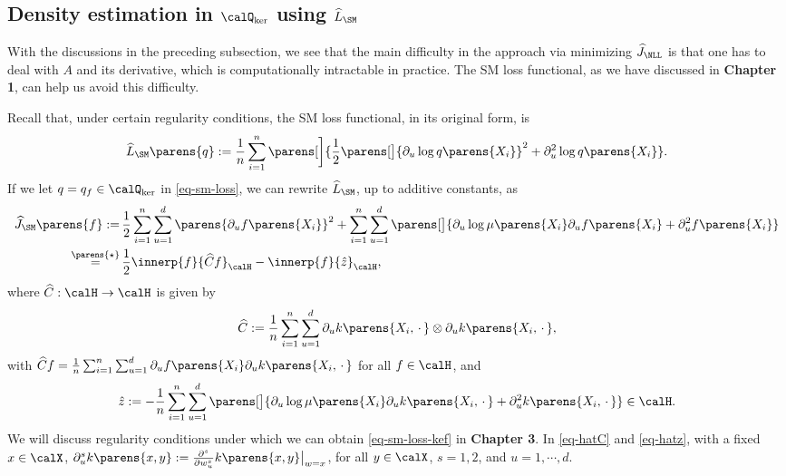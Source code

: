 \documentclass[12pt]{article}
\theoremstyle{definition}
\theoremstyle{theorem}
\theoremstyle{remark}
\begin{document}
\subsection{Density estimation in $\calQ_{\ker}$ using $\widehat{L}_{\SM}$}\label{subsection-sm-kef}


With the discussions in the preceding subsection, we see that the main difficulty in the approach via minimizing $\widehat{J}_{\NLL}$ is that one has to deal with $A$ and its derivative, which is computationally intractable in practice. The SM loss functional, as we have discussed in \textbf{\color{red} Chapter 1}, can help us avoid this difficulty. 

Recall that, under certain regularity conditions, the SM loss functional, in its original form, is 
\begin{align}\label{eq-sm-loss}
	\widehat{L}_{\SM} \parens{q} := \frac{1}{n} \sum_{i=1}^n \parens[\bigg]{\frac{1}{2} \parens[\big]{\partial_u \log q \parens{X_i}}^2 + \partial_u^2 \log q \parens{X_i}}. 
\end{align}
If we let $q = q_f \in \calQ_{\ker}$ in \eqref{eq-sm-loss}, we can rewrite $\widehat{L}_{\SM}$, up to additive constants, as 
\begin{align}
	\widehat{J}_{\SM} \parens{f} := & \, \frac{1}{2} \sum_{i=1}^n \sum_{u=1}^d \parens{\partial_u f \parens{X_i}}^2 + \sum_{i=1}^n \sum_{u=1}^d \parens[\big]{\partial_u \log \mu \parens{X_i} \partial_u f \parens{X_i} + \partial_u^2 f \parens{X_i} } \nonumber \\
	\stackrel{\parens{\star}}{=} & \, \frac{1}{2} \innerp{f}{\widehat{C} f}_{\calH} - \innerp{f}{\hat{z}}_{\calH}, \label{eq-sm-loss-kef}
\end{align}
where $\widehat{C}: \calH \to \calH$ is given by 
\begin{align}\label{eq-hatC}
	\widehat{C} := \frac{1}{n} \sum_{i=1}^n \sum_{u=1}^d \partial_u k \parens{X_i, \,\cdot\,} \otimes \partial_u k \parens{X_i, \,\cdot\,}, 
\end{align}
with $\widehat{C} f = \frac{1}{n} \sum_{i=1}^n \sum_{u=1}^d \partial_u f \parens{X_i} \partial_u k \parens{X_i, \,\cdot\,}$ for all $f \in \calH$, and 
\begin{align}\label{eq-hatz}
	\hat{z} := - \frac{1}{n} \sum_{i=1}^n \sum_{u=1}^d \parens[\big]{\partial_u \log \mu \parens{X_i} \partial_u k \parens{X_i, \,\cdot\,} + \partial_u^2 k \parens{X_i, \,\cdot\,}} \in \calH. 
\end{align}
We will discuss regularity conditions under which we can obtain \eqref{eq-sm-loss-kef} in \textbf{\color{red} Chapter 3}. In \eqref{eq-hatC} and \eqref{eq-hatz}, with a fixed $x \in \calX$, $\partial_u^s k \parens{x, y} := \frac{\partial^s}{\partial w_u^s} k \parens{x, y}\big\vert_{w = x}$, for all $y \in \calX$, $s = 1, 2$, and $u = 1, \cdots, d$. 
\end{document}
